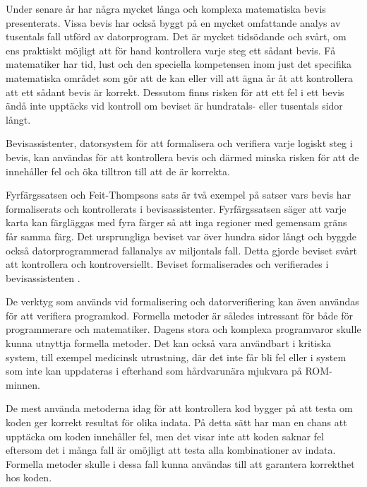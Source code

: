 Under senare år har några mycket långa och komplexa matematiska bevis
presenterats. Vissa bevis har också byggt på en mycket omfattande analys av
tusentals fall utförd av datorprogram. Det är mycket tidsödande och svårt, om
ens praktiskt möjligt att för hand kontrollera varje steg ett sådant bevis. Få
matematiker har tid, lust och den speciella kompetensen inom just det specifika
matematiska området som gör att de kan eller vill att ägna år åt att
kontrollera att ett sådant bevis är korrekt. Dessutom finns risken för att ett
fel i ett bevis ändå inte upptäcks vid kontroll om beviset är hundratals- eller
tusentals sidor långt\cite{harrison2008formal}.

Bevisassistenter, datorsystem för att formalisera och verifiera varje logiskt
steg i bevis, kan användas för att kontrollera bevis och därmed minska risken
för att de innehåller fel och öka tilltron till att de är korrekta.

Fyrfärgssatsen\cite{gonthier2008formal} och Feit-Thompsons
sats\cite{aschbacher2004status} är två exempel på satser vars bevis har
formaliserats och kontrollerats i bevisassistenter. Fyrfärgssatsen säger att
varje karta kan färgläggas med fyra färger så att inga regioner med gemensam
gräns får samma färg. Det ursprungliga beviset var över hundra sidor långt och
byggde också datorprogrammerad fallanalys av miljontals fall. Detta gjorde
beviset svårt att kontrollera och kontroversiellt. Beviset formaliserades och
verifierades i bevisassistenten .

De verktyg som används vid formalisering och datorverifiering kan även användas
för att verifiera programkod. Formella metoder är således intressant för både
för programmerare och matematiker.
Dagens stora och komplexa programvaror skulle kunna utnyttja formella metoder.
Det kan också vara användbart i kritiska system, till exempel medicinsk
utrustning, där det inte får bli fel eller i system som inte kan uppdateras i
efterhand som hårdvarunära mjukvara på ROM-minnen.

De mest använda metoderna idag för att kontrollera kod bygger på att testa om
koden ger korrekt resultat för olika indata. På detta sätt har man en chans att
upptäcka om koden innehåller fel, men det visar inte att koden saknar fel
eftersom det i många fall är omöjligt att testa alla kombinationer av indata.
Formella metoder skulle i dessa fall kunna användas till att garantera
korrekthet hos koden.

